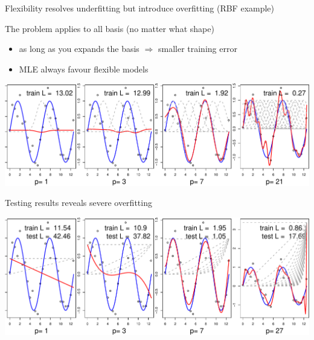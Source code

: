 \documentclass[ignorenonframetext,aspectratio=169]{beamer}
\providecommand{\tightlist}{%
  \setlength{\itemsep}{0pt}\setlength{\parskip}{0pt}}
\begin{document}
\begin{frame}{Flexibility resolves underfitting but introduce
overfitting (RBF example)}
\protect\hypertarget{flexibility-resolves-underfitting-but-introduce-overfitting-rbf-example}{}

The problem applies to all basis (no matter what shape)

\begin{itemize}
\tightlist
\item
  as long as you expands the basis \(\Rightarrow\) smaller training
  error
\item
  MLE always favour flexible models
\end{itemize}

\begin{center}\includegraphics[width=1\linewidth]{lecture10_files/figure-beamer/unnamed-chunk-18-1} \end{center}

\end{frame}

\begin{frame}{Testing results reveals severe overfitting}
\protect\hypertarget{testing-results-reveals-severe-overfitting}{}

\begin{center}\includegraphics[width=1\linewidth]{lecture10_files/figure-beamer/unnamed-chunk-19-1} \end{center}

\end{frame}
\end{document}
